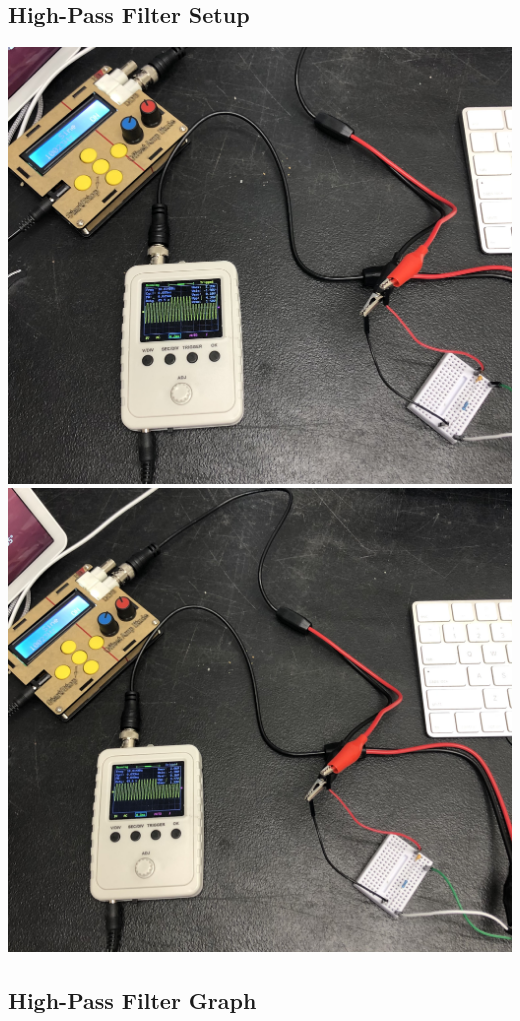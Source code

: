 \documentclass{article}
\begin{document}
\begin{center}
  \subsection*{High-Pass Filter Setup}
  \includegraphics[scale=0.065]{Vrc.jpeg}
  \includegraphics[scale=0.06]{Vr.jpeg}
\end{center}
\begin{center}
  \subsection*{High-Pass Filter Graph}
\end{center}
\end{document}
